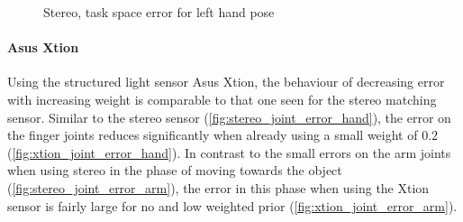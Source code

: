 \begin{figure}
\centering
{}
%
\caption{Stereo, task space error for left hand pose}
\label{fig:stereo_hand_pose_error}
\end{figure}


\paragraph{Asus Xtion}

Using the structured light sensor Asus Xtion, the behaviour of decreasing error with increasing weight is comparable to that one seen for the stereo matching sensor. Similar to the stereo sensor (\cref{fig:stereo_joint_error_hand}), the error on the finger joints reduces significantly when already using a small weight of $0.2$ (\cref{fig:xtion_joint_error_hand}).
In contrast to the small errors on the arm joints when using stereo in the phase of moving towards the object (\cref{fig:stereo_joint_error_arm}), the error in this phase when using the Xtion sensor is fairly large for no and low weighted prior (\cref{fig:xtion_joint_error_arm}).

